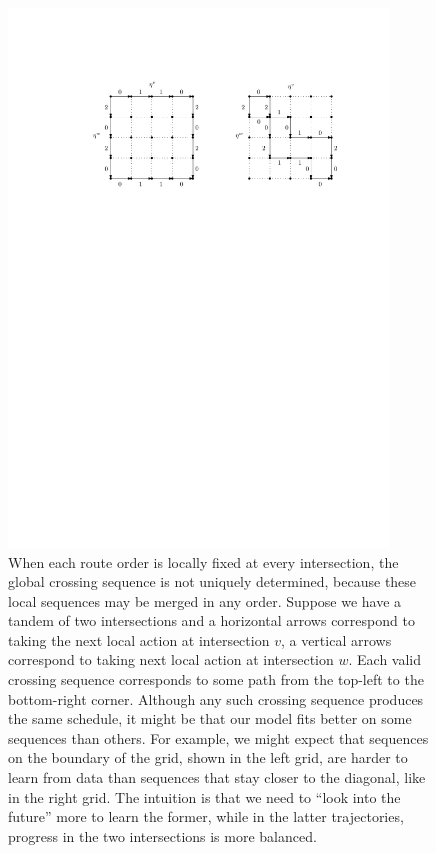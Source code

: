 \documentclass[a4paper]{report}
\theoremstyle{definition}
\theoremstyle{plain}
\begin{document}
\begin{figure}
  \centering
  \includegraphics[width=0.9\textwidth]{figures/network/solution_equivalence}
  \caption{When each route order is locally fixed at every intersection, the
    global crossing sequence is not uniquely determined, because these local
    sequences may be merged in any order. Suppose we have a tandem of two
    intersections and a horizontal arrows correspond to taking the next local
    action at intersection $v$, a vertical arrows correspond to taking next
    local action at intersection $w$. Each valid crossing sequence corresponds
    to some path from the top-left to the bottom-right corner. Although any such
    crossing sequence produces the same schedule, it might be that our
    model fits better on some sequences than others. For example,
    we might expect that sequences on the boundary of the grid, shown in the
    left grid, are harder to learn from data than sequences that stay closer to
    the diagonal, like in the right grid. The intuition is that we need to
    ``look into the future'' more to learn the former, while in the latter
    trajectories, progress in the two intersections is more balanced.}
  \label{fig:solution_equivalence}
\end{figure}
\end{document}
